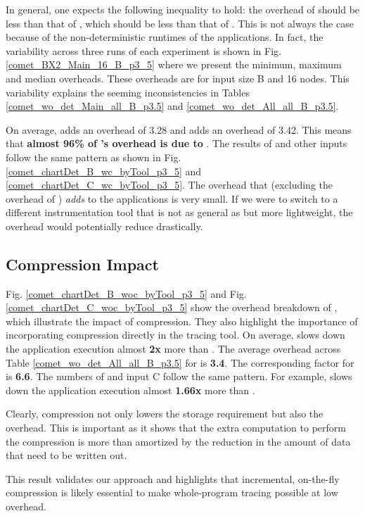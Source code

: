In general, one
expects the following inequality to hold:
 the overhead of \pininit should be less than that of \parlot
, which should be less than that of \parlotnc.
%
This is not always the case because of the non-deterministic runtimes of the applications.
%
In fact, the variability across three runs of each experiment
is shown in Fig. \ref{comet_BX2_Main_16_B_p3_5}
where we present the minimum, maximum and median overheads.
%
These
overheads are for input size B and 16 nodes.
%
This variability explains the seeming inconsistencies in  Tables
\ref{comet_wo_det_Main_all_B_p3.5} and
\ref{comet_wo_det_All_all_B_p3.5}.


On average, \pininit adds
an overhead of 3.28  and \parlota adds an overhead of 3.42.
%
This means that \textbf{almost 96\%
of \parlota's overhead is due to \pin}.
%
The results of \parlotm and
other inputs follow the same pattern
as shown in Fig. \ref{comet_chartDet_B_wc_byTool_p3_5} and \ref{comet_chartDet_C_wc_byTool_p3_5}.
%
The overhead that \parlot (excluding the overhead of \pininit) {\em adds}
to the applications is very small.
%
If we were to switch to a different
instrumentation tool that is not as general as \pin but more
lightweight, the overhead would potentially reduce drastically. \\


\subsection{Compression Impact}
\label{subsec:compact}

Fig. \ref{comet_chartDet_B_woc_byTool_p3_5} and Fig. \ref{comet_chartDet_C_woc_byTool_p3_5} show the  overhead breakdown of \parlotnc, which illustrate the impact of compression. They also highlight the importance of incorporating compression directly in the tracing tool.
%
On average, \parlotnc slows down the application execution almost \textbf{2x} more than \parlota.
%
The average overhead
across Table \ref{comet_wo_det_All_all_B_p3.5} for \parlota is \textbf{3.4}.
%
The  corresponding factor for \parlotnc is \textbf{6.6}.
%
The numbers of \parlotm and input C  follow the same pattern. For example, \parlotnc slows down the application execution almost \textbf{1.66x} more than \parlotm.
%

Clearly, compression not only lowers the storage requirement but also the overhead. This is important as it shows that the extra computation to perform the compression is more than amortized by the reduction in the amount of data that need to be written out.
%

This result validates our approach and highlights that incremental, on-the-fly compression is likely essential to make whole-program tracing possible at low overhead.
